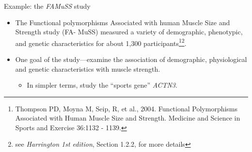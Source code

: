 \documentclass[10pt,handout]{beamer}\usepackage[]{graphicx}\usepackage[]{color}
\begin{document}
\begin{frame}{Example: the \emph{FAMuSS} study}
	\protect\hypertarget{example-the-famuss-study}{}
	
\begin{itemize}
\item The Functional polymorphisms Associated with human Muscle Size and Strength study (FA-
MuSS) measured a variety of demographic, phenotypic, and genetic characteristics for about 1,300
participants\footnote{\tiny{Thompson PD, Moyna M, Seip, R, et al., 2004. Functional Polymorphisms Associated with Human Muscle Size and
		Strength. Medicine and Science in Sports and Exercise 36:1132 - 1139.}}\footnote[,2]{\tiny{see \emph{Harrington 1st edition}, Section 1.2.2, for more details}}. 
	
			\pause 
			
	\item One goal of the study---examine the association of demographic, physiological and genetic characteristics with muscle strength.
	
	\begin{itemize}
		\tightlist
		\item
		In simpler terms, study the ``sports gene'' \emph{ACTN3}.
	\end{itemize}
	
	
\end{itemize}
	
	
	
\end{frame}
\end{document}
